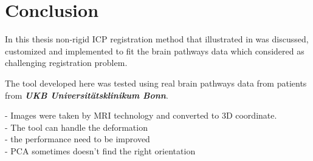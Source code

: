 \documentclass[../structure.tex]{subfiles}
\begin{document}
\chapter{Conclusion}
In this thesis non-rigid ICP registration method that illustrated in \cite{Amberg2007} was discussed, customized and implemented to fit the brain pathways data which considered as challenging registration problem.

The tool developed here was tested using real brain pathways data from patients from \textbf{\textit{UKB Universitätsklinikum Bonn}}.

- Images were taken by MRI technology and converted to 3D coordinate.\\
- The tool can handle the deformation\\
- the performance need to be improved\\
- PCA sometimes doesn't find the right orientation\\
\end{document}
